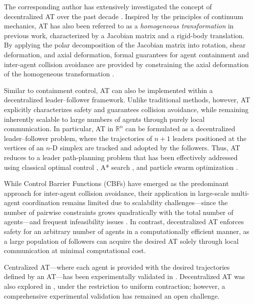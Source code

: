 \documentclass[journal]{IEEEtran}
\theoremstyle{definition}
\theoremstyle{plain}
\begin{document}
The corresponding author has extensively investigated the concept of decentralized AT over the past decade \cite{rastgoftar2021safe, rastgoftar2022integration, rastgoftar2021scalable}. Inspired by the principles of continuum mechanics, AT has also been referred to as a \textit{homogeneous transformation} in previous work, characterized by a Jacobian matrix and a rigid-body translation. By applying the polar decomposition of the Jacobian matrix into rotation, shear deformation, and axial deformation, formal guarantees for agent containment and inter-agent collision avoidance are provided by constraining the axial deformation of the homogeneous transformation \cite{rastgoftar2021safe, rastgoftar2021scalable}.

Similar to containment control, AT can also be implemented within a decentralized leader–follower framework. Unlike traditional methods, however, AT explicitly characterizes safety and guarantees collision avoidance, while remaining inherently scalable to large numbers of agents through purely local communication. In particular, AT in $\mathbb{R}^n$ can be formulated as a decentralized leader–follower problem, where the trajectories of $n+1$ leaders positioned at the vertices of an $n$-D simplex are tracked and adopted by the followers. Thus, AT reduces to a leader path-planning problem that has been effectively addressed using classical optimal control \cite{rastgoftar2018cooperative}, A* search \cite{rastgoftar2022integration, rastgoftar2021scalable}, and particle swarm optimization \cite{liang2019multi}.

While Control Barrier Functions (CBFs) have emerged as the predominant approach for inter-agent collision avoidance, their application in large-scale multi-agent coordination remains limited due to scalability challenges—since the number of pairwise constraints grows quadratically with the total number of agents—and frequent infeasibility issues \cite{wang2017safety, xiao2021cbf, xu2022feasible, xu2020constrained}. In contrast, decentralized AT enforces safety for an arbitrary number of agents in a computationally efficient manner, as a large population of followers can acquire the desired AT solely through local communication at minimal computational cost.



Centralized AT—where each agent is provided with the desired trajectories defined by an AT—has been experimentally validated in \cite{romano2019experimental, 10156556}. Decentralized AT was also explored in \cite{romano2019experimental}, under the restriction to uniform contraction; however, a comprehensive experimental validation has remained an open challenge.
\end{document}
